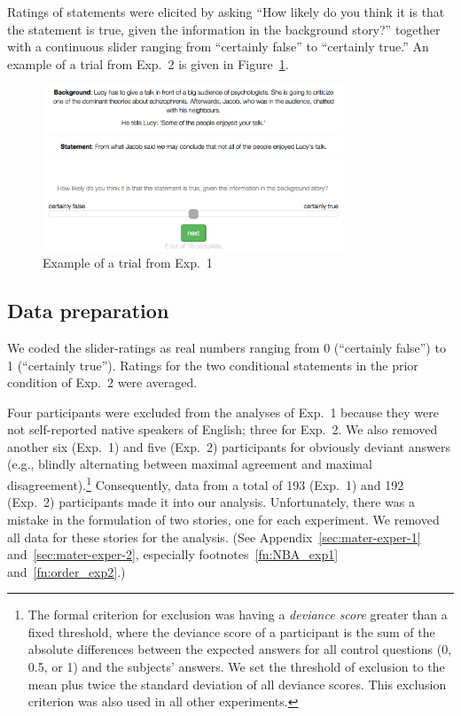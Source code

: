 \documentclass[12pt]{article}
\begin{document}
Ratings of statements were elicited by asking ``How likely do you think it is that the
statement is true, given the information in the background story?'' together with a continuous
slider ranging from ``certainly false'' to ``certainly true.'' An example of a trial from Exp.\ 2 is given
in Figure~\ref{fig:exampleShot}.

\begin{figure}
  \centering
  \includegraphics[width = 0.8\textwidth]{pics_02/expExampleShot_Lucy.png}
  \caption{Example of a trial from Exp.~1}
  \label{fig:exampleShot}
\end{figure}

\subsection*{Data preparation} 

We coded the slider-ratings as real numbers ranging from 0
(``certainly false'') to 1 (``certainly true''). Ratings for the two conditional statements in the prior condition of Exp.\ 2 were averaged.

Four participants were excluded from the analyses of Exp.~1 because they were not self-reported
native speakers of English; three for Exp.~2. We also removed another six (Exp.~1) and five
(Exp.~2) participants for obviously deviant answers (e.g., blindly alternating between maximal
agreement and maximal disagreement).\footnote{The formal criterion for exclusion was having a
  \emph{deviance score} greater than a fixed threshold, where the deviance score of a
  participant is the sum of the absolute differences between the expected answers for all
  control questions (0, 0.5, or 1) and the subjects'
  answers. %
  We set the threshold of exclusion to the mean plus twice the standard deviation of all
  deviance scores. This exclusion criterion was also used in all other experiments.}
Consequently, data from a total of 193 (Exp.\ 1) and 192 (Exp.\ 2) participants made it into
our analysis. Unfortunately, there was a mistake in the formulation of two stories, one for
each experiment. We removed all data for these stories for the analysis. (See
Appendix~\ref{sec:mater-exper-1} and~\ref{sec:mater-exper-2}, especially
footnotes~\ref{fn:NBA_exp1} and~\ref{fn:order_exp2}.)
\end{document}
